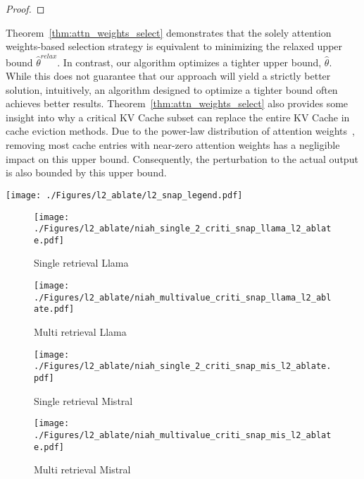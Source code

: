 {\begin{proof}
	
\end{proof}
Theorem~\ref{thm:attn_weights_select} demonstrates that the solely attention weights-based selection strategy is equivalent to minimizing the relaxed upper bound \(\hat{\theta}^{relax}\).
In contrast, our algorithm optimizes a tighter upper bound, $\hat{\theta}$. While this does not guarantee that our approach will yield a strictly better solution, intuitively, an algorithm designed to optimize a tighter bound often achieves better results.
Theorem~\ref{thm:attn_weights_select} also provides some insight into why a critical KV Cache subset can replace the entire KV Cache in cache eviction methods. Due to the power-law distribution of attention weights~\cite{h2o}, removing most cache entries with near-zero attention weights has a negligible impact on this upper bound. Consequently, the perturbation to the actual output is also bounded by this upper bound.





\begin{figure*}[t!]
	\centering
	\begin{minipage}{\linewidth}
		\centering
		\texttt{[image: ./Figures/l2\_ablate/l2\_snap\_legend.pdf]}
	\end{minipage}
	\begin{subfigure}[b]{0.24\linewidth}
		\centering
		\texttt{[image: ./Figures/l2\_ablate/niah\_single\_2\_criti\_snap\_llama\_l2\_ablate.pdf]}
		\vspace{-0.5cm}
		\caption{\centering  Single retrieval \newline Llama}
		\label{subfig:snap_llama_l2_single}
	\end{subfigure}
	\begin{subfigure}[b]{0.24\linewidth}
		\centering
		\texttt{[image: ./Figures/l2\_ablate/niah\_multivalue\_criti\_snap\_llama\_l2\_ablate.pdf]}
		\vspace{-0.5cm}
		\caption{\centering  Multi retrieval \newline Llama}
		\label{subfig:snap_llama_l2_multi}
	\end{subfigure}
	\begin{subfigure}[b]{0.24\linewidth}
		\centering
		\texttt{[image: ./Figures/l2\_ablate/niah\_single\_2\_criti\_snap\_mis\_l2\_ablate.pdf]}
		\vspace{-0.5cm}
		\caption{\centering  Single retrieval \newline Mistral}
		\label{subfig:snap_mis_l2_single}
	\end{subfigure}
	\begin{subfigure}[b]{0.24\linewidth}
		\centering
		\texttt{[image: ./Figures/l2\_ablate/niah\_multivalue\_criti\_snap\_mis\_l2\_ablate.pdf]}
		\vspace{-0.5cm}
		\caption{\centering  Multi retrieval \newline Mistral}
		\label{subfig:snap_mis_l2_multi}
	\end{subfigure}
	

\end{figure*}}
